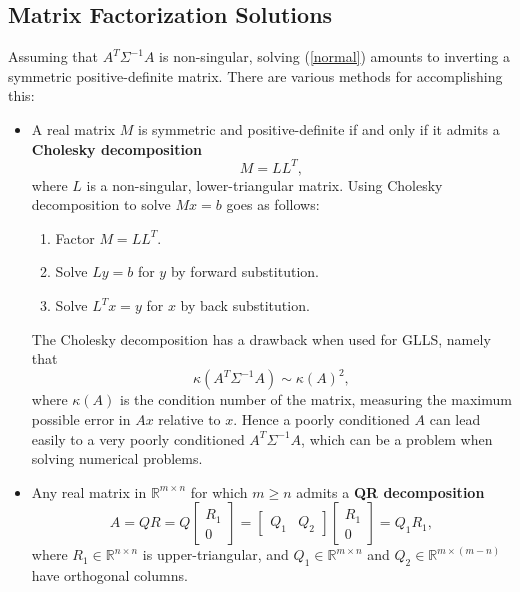 \documentclass{amsart}
\begin{document}
\subsection{Matrix Factorization Solutions}
Assuming that $A^T \Sigma^{-1} A$ is non-singular, solving (\ref{normal}) amounts to inverting a
symmetric positive-definite matrix. There are various methods for accomplishing this:
\begin{itemize}
    \item A real matrix $M$ is symmetric and positive-definite if and only if it admits
    a \textbf{Cholesky decomposition}
    $$
    M = LL^T,
    $$
    where $L$ is a non-singular, lower-triangular matrix. Using Cholesky decomposition to solve
    $Mx = b$ goes as follows:
    \begin{enumerate}
        \item Factor $M = LL^T$.
        \item Solve $Ly = b$ for $y$ by forward substitution.
        \item Solve $L^Tx = y$ for $x$ by back substitution.
    \end{enumerate}
    The Cholesky decomposition has a drawback when used for GLLS, namely that
    $$
    \kappa(A^T \Sigma^{-1} A) \sim \kappa(A)^2,
    $$
    where $\kappa(A)$ is the condition
    number of the matrix, measuring the maximum possible error in $Ax$ relative to $x$. Hence
    a poorly conditioned $A$ can lead easily to a very poorly conditioned $A^T \Sigma^{-1} A$, which
    can be a problem when solving numerical problems.

\item Any real matrix in $\mathbb R^{m \times n}$ for which $m \ge n$ admits
    a \textbf{QR decomposition}
        $$
            A = QR = Q \begin{bmatrix} R_1 \\ 0 \end{bmatrix}
                = \begin{bmatrix} Q_1 & Q_2 \end{bmatrix}
                    \begin{bmatrix} R_1 \\ 0 \end{bmatrix}
                        = Q_1 R_1,
        $$
    where $R_1 \in \mathbb R^{n \times n}$ is upper-triangular, and
    $Q_1 \in \mathbb R^{m \times n}$ and $Q_2 \in \mathbb R^{m \times(m-n)}$
    have orthogonal columns.
\end{itemize}
\end{document}
